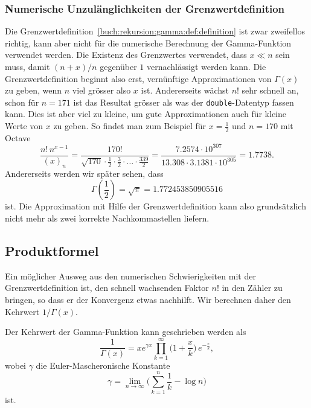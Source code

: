 \subsubsection{Numerische Unzulänglichkeiten der Grenzwertdefinition}
Die Grenzwertdefinition~\ref{buch:rekursion:gamma:def:definition}
ist zwar zweifellos richtig, kann aber nicht für die numerische 
Berechnung der Gamma-Funktion verwendet werden.
Die Existenz des Grenzwertes verwendet, dass $x\ll n$ sein muss,
damit $(n+x)/n$ gegenüber $1$ vernachlässigt werden kann.
Die Grenzwertdefinition beginnt also erst, vernünftige Approximationen
von $\Gamma(x)$ zu geben, wenn $n$ viel grösser also $x$ ist.
Andererseits wächst $n!$ sehr schnell an, schon für $n=171$ ist
das Resultat grösser als was der \texttt{double}-Datentyp fassen kann.
Dies ist aber viel zu kleine, um gute Approximationen auch für kleine
Werte von $x$ zu geben.
So findet man zum Beispiel für $x=\frac12$ und $n=170$ mit Octave
\[
\frac{n!\,n^{x-1}}{(x)_n}
=
\frac{170!}{\sqrt{170}\cdot \frac12\cdot\frac32\cdot\ldots\cdot\frac{339}{2}}
=
\frac{7.2574\cdot10^{307}}{13.308\cdot 3.1381\cdot10^{305}}
=
1.7738.
\]
Andererseits werden wir später sehen, dass 
\[
\Gamma({\textstyle\frac12})
=
\sqrt{\pi}
=
1.772453850905516
\]
ist.
Die Approximation mit Hilfe der Grenzwertdefinition kann also
grundsätzlich nicht mehr als zwei korrekte Nachkommastellen liefern.

\subsection{Produktformel}
Ein möglicher Ausweg aus den numerischen Schwierigkeiten mit der
Grenzwertdefinition ist, den schnell wachsenden Faktor $n!$
in den Zähler zu bringen, so dass er der Konvergenz etwas nachhilft.
Wir berechnen daher den Kehrwert $1/\Gamma(x)$.

\begin{satz}
\label{buch:rekursion:gamma:satz:produktformel}
Der Kehrwert der Gamma-Funktion kann geschrieben werden als
\begin{equation}
\frac{1}{\Gamma(x)}
=
xe^{\gamma x}
\prod_{k=1}^\infty
\biggl(1+\frac{x}k\biggr)\,e^{-\frac{x}{k}},
\label{buch:rekursion:gamma:eqn:produktformel}
\end{equation}
wobei $\gamma$ die Euler-Mascheronische Konstante
\[
\gamma
=
\lim_{n\to\infty}
\biggl(\sum_{k=1}^n\frac{1}{k}-\log n\biggr)
\]
ist.
\end{satz}

